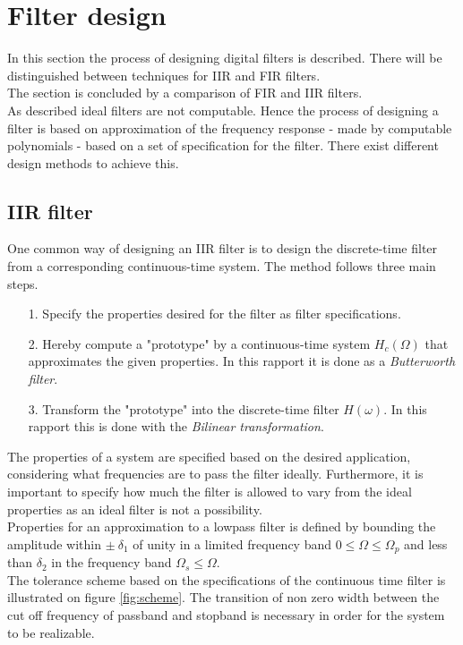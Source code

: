 \section{Filter design}
In this section the process of designing digital filters is described. There will be distinguished between techniques for IIR and FIR filters.\\ The section is concluded by a comparison of FIR and IIR filters.\\  
As described ideal filters are not computable. Hence the process of designing a filter is based on approximation of the frequency response - made by computable polynomials - based on a set of specification for the filter. There exist different design methods to achieve this.   
\subsection{IIR filter}
One common way of designing an IIR filter is to design the discrete-time filter from a corresponding continuous-time system. The method follows three main steps. 
\begin{itemize}
\item[1.] Specify the properties desired for the filter as filter specifications.
\item[2.] Hereby compute a "prototype" by a continuous-time system $H_c(\Omega)$ that approximates the given properties. In this rapport it is done as a \textit{Butterworth filter}.  
\item[3.] Transform the "prototype" into the discrete-time filter $H(\omega)$. In this rapport this is done with the \textit{Bilinear transformation}. 
\end{itemize}
The properties of a system are specified based on the desired application, considering what frequencies are to pass the filter ideally. Furthermore, it is important to specify how much the filter is allowed to vary from the ideal properties as an ideal filter is not a possibility. \\
Properties for an approximation to a lowpass filter is defined by bounding the amplitude within $\pm \ \delta_1$ of unity in a limited frequency band $0 \leq \Omega \leq \Omega_p $ and less than $\delta_2$ in the frequency band $\Omega_s \leq \Omega$. \\
The tolerance scheme based on the specifications of the continuous time filter is illustrated on figure \ref{fig:scheme}.
The transition of non zero width between the cut off frequency of passband and stopband is necessary in order for the system to be realizable.

